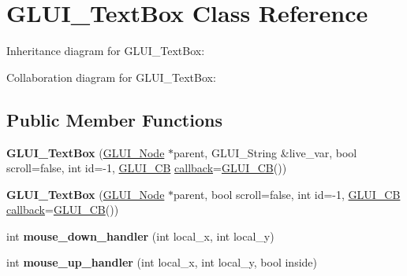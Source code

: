 \hypertarget{class_g_l_u_i___text_box}{\section{G\+L\+U\+I\+\_\+\+Text\+Box Class Reference}
\label{class_g_l_u_i___text_box}
}


Inheritance diagram for G\+L\+U\+I\+\_\+\+Text\+Box\+:


Collaboration diagram for G\+L\+U\+I\+\_\+\+Text\+Box\+:
\subsection*{Public Member Functions}
\begin{DoxyCompactItemize}
\item 
\hypertarget{class_g_l_u_i___text_box_a2973d6ed429cb52fc794273939fbbcdb}{{\bfseries G\+L\+U\+I\+\_\+\+Text\+Box} (\hyperlink{class_g_l_u_i___node}{G\+L\+U\+I\+\_\+\+Node} $\ast$parent, G\+L\+U\+I\+\_\+\+String \&live\+\_\+var, bool scroll=false, int id=-\/1, \hyperlink{class_g_l_u_i___c_b}{G\+L\+U\+I\+\_\+\+C\+B} \hyperlink{class_g_l_u_i___control_a96060fe0cc6d537e736dd6eef78e24ab}{callback}=\hyperlink{class_g_l_u_i___c_b}{G\+L\+U\+I\+\_\+\+C\+B}())}\label{class_g_l_u_i___text_box_a2973d6ed429cb52fc794273939fbbcdb}

\item 
\hypertarget{class_g_l_u_i___text_box_a91e7c9fcb2f00ac68e9d10dcb9a09769}{{\bfseries G\+L\+U\+I\+\_\+\+Text\+Box} (\hyperlink{class_g_l_u_i___node}{G\+L\+U\+I\+\_\+\+Node} $\ast$parent, bool scroll=false, int id=-\/1, \hyperlink{class_g_l_u_i___c_b}{G\+L\+U\+I\+\_\+\+C\+B} \hyperlink{class_g_l_u_i___control_a96060fe0cc6d537e736dd6eef78e24ab}{callback}=\hyperlink{class_g_l_u_i___c_b}{G\+L\+U\+I\+\_\+\+C\+B}())}\label{class_g_l_u_i___text_box_a91e7c9fcb2f00ac68e9d10dcb9a09769}

\item 
\hypertarget{class_g_l_u_i___text_box_a193bf66dde6e93a501af7a04dd57fec3}{int {\bfseries mouse\+\_\+down\+\_\+handler} (int local\+\_\+x, int local\+\_\+y)}\label{class_g_l_u_i___text_box_a193bf66dde6e93a501af7a04dd57fec3}

\item 
\hypertarget{class_g_l_u_i___text_box_ae2ec21715ffdacd73497acc91444a637}{int {\bfseries mouse\+\_\+up\+\_\+handler} (int local\+\_\+x, int local\+\_\+y, bool inside)}\label{class_g_l_u_i___text_box_ae2ec21715ffdacd73497acc91444a637}


\end{DoxyCompactItemize}
